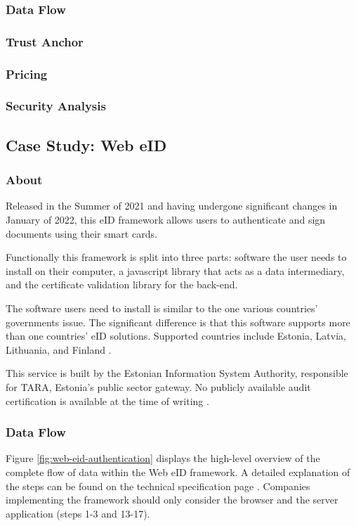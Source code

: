 \subsubsection{Data Flow}
\subsubsection{Trust Anchor}
\subsubsection{Pricing}
\subsubsection{Security Analysis}

\subsection{Case Study: Web eID}

\subsubsection{About}

Released in the Summer of 2021 \cite{ria-webeid} and having undergone significant changes in January of 2022, this eID framework allows users to authenticate and sign documents using their smart cards.

Functionally this framework is split into three parts: software the user needs to install on their computer, a javascript library that acts as a data intermediary, and the certificate validation library for the back-end.

The software users need to install is similar to the one various countries' governments issue. The significant difference is that this software supports more than one countries' eID solutions. Supported countries include Estonia, Latvia, Lithuania, and Finland \cite{ria-webeid}.

This service is built by the Estonian Information System Authority, responsible for TARA, Estonia's public sector gateway. No publicly available audit certification is available at the time of writing .

\subsubsection{Data Flow}

Figure \ref{fig:web-eid-authentication} displays the high-level overview of the complete flow of data within the Web eID framework. A detailed explanation of the steps can be found on the technical specification page \cite{ria-webeid-systemarchitecture}. Companies implementing the framework should only consider the browser and the server application (steps 1-3 and 13-17).

